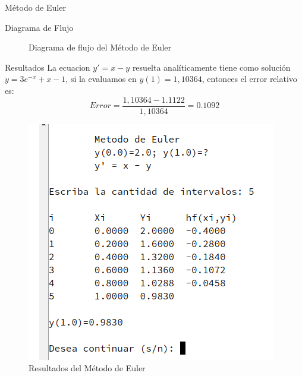 \documentclass[letterpaper, 12pt]{article}
\begin{document}
\begin{section}{Método de Euler}
\begin{subsection}{Diagrama de Flujo}
\begin{figure}[h]
        \caption{Diagrama de flujo del Método de Euler}
      \end{figure}
    \end{subsection}
    \newpage
    \begin{subsection}{Resultados}
      La ecuacion $y' = x -y$ resuelta analíticamente tiene como solución $y = 3e^{-x} +x -1$, si la evaluamos en $y(1)=1,10364$, entonces el error relativo es:
      \[Error = \frac{1,10364 - 1.1122}{1,10364} = 0.1092\]
      \begin{figure}[h]
        \centering
        \includegraphics[scale=1.0]{Euler.png}
        \caption{Resultados del Método de Euler}
      \end{figure}
    \end{subsection}
  \end{section}
  \newpage
\end{document}
